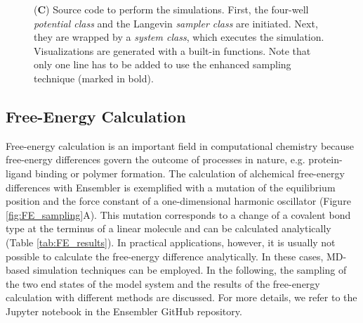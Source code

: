 \begin{figure}[h]
{	(\textbf{C}) Source code to perform the simulations. First, the four-well \textit{potential class} and the Langevin \textit{sampler class} are initiated. Next, they are wrapped by a \textit{system class}, which executes the simulation. Visualizations are generated with a built-in functions. Note that only one line has to be added to use the enhanced sampling technique (marked in bold).}
\label{fig:code_example_simulations}
\end{figure}

\FloatBarrier
\clearpage

\subsection{Free-Energy Calculation}

Free-energy calculation is an important field in computational chemistry because free-energy differences govern the outcome of processes in nature, e.g. protein-ligand binding or polymer formation.\cite{Christ2009, Hansen2014, Cournia2020, Armacost2020} 
%
The calculation of alchemical free-energy differences with Ensembler is exemplified with a mutation of the equilibrium position and the force constant of a one-dimensional harmonic oscillator (Figure \ref{fig:FE_sampling}A).
This mutation corresponds to a change of a covalent bond type at the terminus of a linear molecule and can be calculated analytically (Table \ref{tab:FE_results}).
In practical applications, however, it is usually not possible to calculate the free-energy difference analytically. In these cases, MD-based simulation techniques can be employed.
In the following, the sampling of the two end states of the model system and the results of the free-energy calculation with different methods are discussed. For more details, we refer to the Jupyter notebook in the Ensembler GitHub repository.

